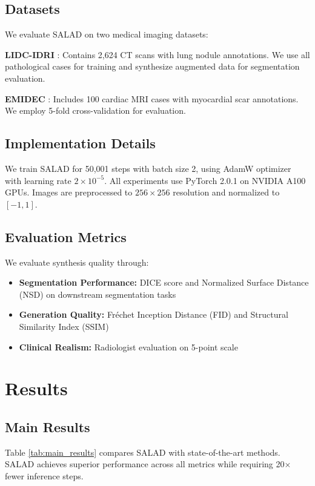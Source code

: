 \documentclass[10pt,twocolumn]{article}
\begin{document}
\subsection{Datasets}

We evaluate SALAD on two medical imaging datasets:

\textbf{LIDC-IDRI} \cite{armato2011lung}: Contains 2,624 CT scans with lung nodule annotations. We use all pathological cases for training and synthesize augmented data for segmentation evaluation.

\textbf{EMIDEC} \cite{lalande2022emidec}: Includes 100 cardiac MRI cases with myocardial scar annotations. We employ 5-fold cross-validation for evaluation.

\subsection{Implementation Details}

We train SALAD for 50,001 steps with batch size 2, using AdamW optimizer with learning rate $2 \times 10^{-5}$. All experiments use PyTorch 2.0.1 on NVIDIA A100 GPUs. Images are preprocessed to $256 \times 256$ resolution and normalized to $[-1, 1]$.

\subsection{Evaluation Metrics}

We evaluate synthesis quality through:
\begin{itemize}
\item \textbf{Segmentation Performance:} DICE score and Normalized Surface Distance (NSD) on downstream segmentation tasks
\item \textbf{Generation Quality:} Fréchet Inception Distance (FID) and Structural Similarity Index (SSIM)
\item \textbf{Clinical Realism:} Radiologist evaluation on 5-point scale
\end{itemize}

\section{Results}

\subsection{Main Results}

Table \ref{tab:main_results} compares SALAD with state-of-the-art methods. SALAD achieves superior performance across all metrics while requiring 20× fewer inference steps.
\end{document}
